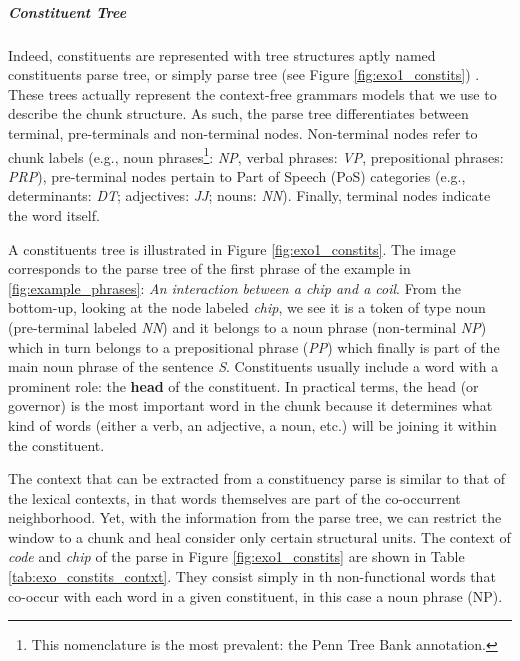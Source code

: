 \subparagraph{Constituent Tree}
Indeed, constituents are  represented with tree structures aptly named  constituents parse tree, or simply parse tree (see Figure \ref{fig:exo1_constits}) \cite{JurafskyM09}. These trees actually represent the context-free grammars models that we use to describe the chunk structure. As such, the parse tree differentiates between terminal, pre-terminals and non-terminal nodes. Non-terminal nodes refer to chunk labels (e.g., noun phrases\footnote{This nomenclature is the most prevalent: the Penn Tree Bank annotation.}: \textit{NP}, verbal phrases: \textit{VP}, prepositional phrases: \textit{PRP}), pre-terminal nodes pertain to Part of Speech (PoS) categories (e.g., determinants: \textit{DT}; adjectives: \textit{JJ}; nouns: \textit{NN}). Finally, terminal nodes indicate the word itself. 

A constituents tree is illustrated in Figure \ref{fig:exo1_constits}. The image corresponds to the parse tree of the first phrase of the example in \ref{fig:example_phrases}: \textit{An interaction between a chip and a coil}. From the bottom-up,  looking at the node labeled \textit{chip}, we see it is a token of type noun (pre-terminal labeled \textit{NN}) and it belongs to a noun phrase (non-terminal \textit{NP}) which in turn belongs to a prepositional phrase (\textit{PP}) which finally is part of the main noun phrase of the sentence \textit{S}. Constituents usually include a word with a prominent role: the \textbf{head} of the constituent. In practical terms, the head (or governor) is the most important word in the chunk because it determines what kind of words (either a verb, an adjective, a noun, etc.) will be joining it within the constituent. 

The context that can be extracted from a constituency parse is similar to that of the lexical contexts, in that words themselves are part of the co-occurrent neighborhood. Yet, with the information from the parse tree, we can restrict the window to a chunk and heal consider only certain structural units. The context of \textit{code} and \textit{chip} of the parse  in Figure \ref{fig:exo1_constits} are shown in Table \ref{tab:exo_constits_contxt}. They consist simply in th non-functional words that co-occur with each word in a given constituent, in this case a noun phrase (NP).

